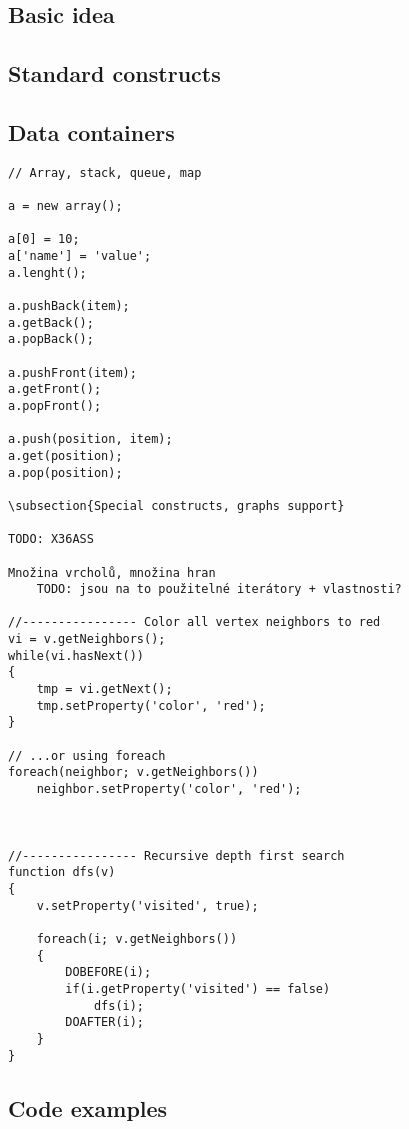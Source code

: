 \documentclass[11pt,twoside,a4paper]{book}
\begin{document}
\subsection{Basic idea}

\subsection{Standard constructs}


\subsection{Data containers}

\begin{verbatim}
// Array, stack, queue, map

a = new array();

a[0] = 10;
a['name'] = 'value';
a.lenght();

a.pushBack(item);
a.getBack();
a.popBack();

a.pushFront(item);
a.getFront();
a.popFront();

a.push(position, item);
a.get(position);
a.pop(position);

\subsection{Special constructs, graphs support}

TODO: X36ASS

Množina vrcholů, množina hran
	TODO: jsou na to použitelné iterátory + vlastnosti?

//---------------- Color all vertex neighbors to red
vi = v.getNeighbors();
while(vi.hasNext())
{
	tmp = vi.getNext();
	tmp.setProperty('color', 'red');
}

// ...or using foreach
foreach(neighbor; v.getNeighbors())
	neighbor.setProperty('color', 'red');



//---------------- Recursive depth first search
function dfs(v)
{
	v.setProperty('visited', true);

	foreach(i; v.getNeighbors())
	{
		DOBEFORE(i);
		if(i.getProperty('visited') == false)
			dfs(i);
		DOAFTER(i);
	}
}
\end{verbatim}


\subsection{Code examples}
\end{document}
